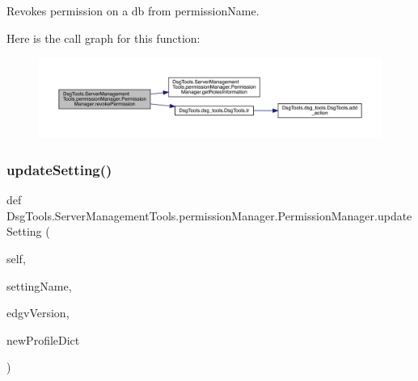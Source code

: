 \begin{DoxyVerb}Revokes permission on a db from permissionName.
\end{DoxyVerb}
 Here is the call graph for this function\+:
\nopagebreak
\begin{figure}[H]
\begin{center}
\leavevmode
\includegraphics[width=350pt]{class_dsg_tools_1_1_server_management_tools_1_1permission_manager_1_1_permission_manager_a3ad2577af28425c49f5013968937dde5_cgraph}
\end{center}
\end{figure}
\mbox{\label{class_dsg_tools_1_1_server_management_tools_1_1permission_manager_1_1_permission_manager_a26e0604c4107fc31713534e7a939de30}} 
\subsubsection{\texorpdfstring{update\+Setting()}{updateSetting()}}
{\footnotesize\ttfamily def Dsg\+Tools.\+Server\+Management\+Tools.\+permission\+Manager.\+Permission\+Manager.\+update\+Setting (\begin{DoxyParamCaption}\item[{}]{self,  }\item[{}]{setting\+Name,  }\item[{}]{edgv\+Version,  }\item[{}]{new\+Profile\+Dict }\end{DoxyParamCaption})}

